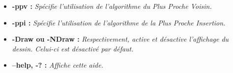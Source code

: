 \documentclass{article}
\begin{document}
\begin{itemize}
\item \textbf{-ppv :} \emph{Spécifie l'utilisation de l'algorithme du Plus Proche Voisin.}\smallskip

\item \textbf{-ppi :} \emph{Spécifie l'utilisation de l'algorithme de la Plus Proche Insertion.}\smallskip

\item \textbf{-Draw ou -NDraw :} \emph{Respectivement, active et désactive l'affichage du dessin.
Celui-ci est désactivé par défaut.}\smallskip

\item \textbf{--help, -? :} \emph{Affiche cette aide.}
\end{itemize}															
							
\end{document}
